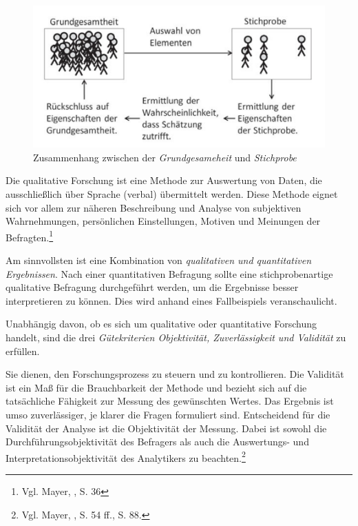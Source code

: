 \begin{figure}[h]
    \centering
    \includegraphics[width=1\textwidth]{images/zsmhGrundStich}
    \caption{Zusammenhang zwischen der \textit{Grundgesameheit} und \textit{Stichprobe}}
    \label{fig:GrundgesamtheitStichprobe}
\end{figure}

Die qualitative Forschung ist eine Methode zur Auswertung von Daten, die ausschließlich über Sprache (verbal) übermittelt
werden. Diese Methode eignet sich vor allem zur näheren Beschreibung und Analyse von subjektiven Wahrnehmungen, persönlichen
Einstellungen, Motiven und Meinungen der Befragten.\footnote{Vgl. Mayer, \cite{Interview und schriftliche Befragung}, S. 36}

Am sinnvollsten ist eine Kombination von \textit{qualitativen und quantitativen Ergebnissen}. Nach einer quantitativen
Befragung sollte eine stichprobenartige qualitative Befragung durchgeführt werden, um die Ergebnisse besser interpretieren
zu können. Dies wird anhand eines Fallbeispiels veranschaulicht.

Unabhängig davon, ob es sich um qualitative oder quantitative Forschung handelt, sind die drei \textit{Gütekriterien
Objektivität, Zuverlässigkeit und Validität} zu erfüllen.

Sie dienen, den Forschungsprozess zu steuern und zu kontrollieren. Die Validität ist ein Maß für die Brauchbarkeit der
Methode und bezieht sich auf die tatsächliche Fähigkeit zur Messung des gewünschten Wertes. Das Ergebnis ist umso zuverlässiger,
je klarer die Fragen formuliert sind. Entscheidend für die Validität der Analyse ist die Objektivität der Messung. Dabei
ist sowohl die Durchführungsobjektivität des Befragers als auch die Auswertungs- und Interpretationsobjektivität des
Analytikers zu beachten.\footnote{Vgl. Mayer, \cite{Interview und schriftliche Befragung}, S. 54 ff., S. 88.}

